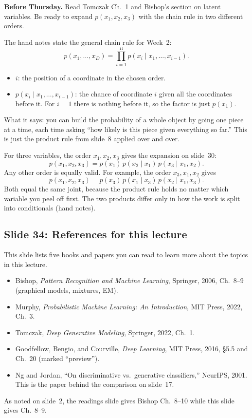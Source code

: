 \textbf{Before Thursday.} Read Tomczak Ch.~1 and Bishop's section on latent variables. Be ready to expand $p(x_1,x_2,x_3)$ with the chain rule in two different orders.

The hand notes state the general chain rule for Week~2:
\[
p(x_1,\dots,x_D)=\prod_{i=1}^{D}p(x_i\mid x_1,\dots,x_{i-1}).
\]
\begin{itemize}
\item $i$: the position of a coordinate in the chosen order.
\item $p(x_i\mid x_1,\dots,x_{i-1})$: the chance of coordinate $i$ given all the coordinates before it. For $i=1$ there is nothing before it, so the factor is just $p(x_1)$.
\end{itemize}
What it says: you can build the probability of a whole object by going one piece at a time, each time asking ``how likely is this piece given everything so far.'' This is just the product rule from slide~8 applied over and over.

For three variables, the order $x_1,x_2,x_3$ gives the expansion on slide~30:
\[
p(x_1,x_2,x_3)=p(x_1)\,p(x_2\mid x_1)\,p(x_3\mid x_1,x_2).
\]
Any other order is equally valid. For example, the order $x_3,x_1,x_2$ gives
\[
p(x_1,x_2,x_3)=p(x_3)\,p(x_1\mid x_3)\,p(x_2\mid x_1,x_3).
\]
Both equal the same joint, because the product rule holds no matter which variable you peel off first. The two products differ only in how the work is split into conditionals (hand notes).

\subsection*{Slide 34: References for this lecture}

This slide lists five books and papers you can read to learn more about the topics in this lecture.
\begin{itemize}
\item Bishop, \textit{Pattern Recognition and Machine Learning}, Springer, 2006, Ch.~8--9 (graphical models, mixtures, EM).
\item Murphy, \textit{Probabilistic Machine Learning: An Introduction}, MIT Press, 2022, Ch.~3.
\item Tomczak, \textit{Deep Generative Modeling}, Springer, 2022, Ch.~1.
\item Goodfellow, Bengio, and Courville, \textit{Deep Learning}, MIT Press, 2016, \S5.5 and Ch.~20 (marked ``preview'').
\item Ng and Jordan, ``On discriminative vs.\ generative classifiers,'' NeurIPS, 2001. This is the paper behind the comparison on slide~17.
\end{itemize}
As noted on slide~2, the readings slide gives Bishop Ch.~8--10 while this slide gives Ch.~8--9.

